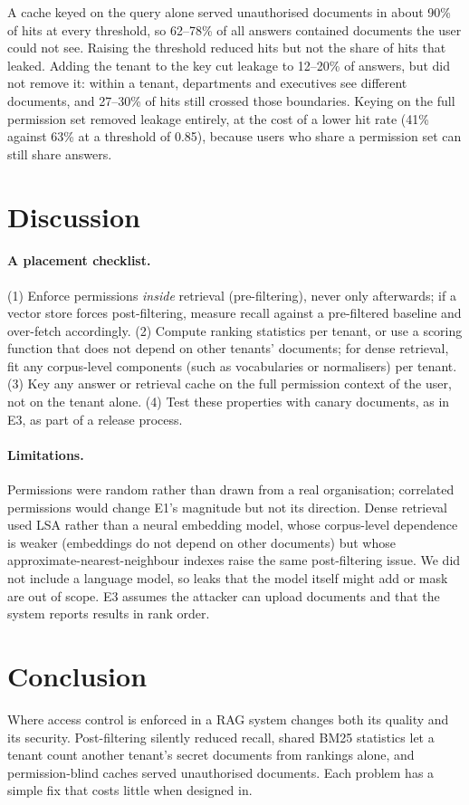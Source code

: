 \documentclass[11pt]{article}
\begin{document}
A cache keyed on the query alone served unauthorised documents in about 90\% of hits at every threshold, so 62--78\% of all answers
contained documents the user could not see. Raising the threshold reduced hits but not the share of hits that leaked. Adding the tenant
to the key cut leakage to 12--20\% of answers, but did not remove it: within a tenant, departments and executives see different
documents, and 27--30\% of hits still crossed those boundaries. Keying on the full permission set removed leakage entirely, at the
cost of a lower hit rate (41\% against 63\% at a threshold of 0.85), because users who share a permission set can still share answers.

\section{Discussion}
\paragraph{A placement checklist.}
(1) Enforce permissions \emph{inside} retrieval (pre-filtering), never only afterwards; if a vector store forces post-filtering, measure
recall against a pre-filtered baseline and over-fetch accordingly. (2) Compute ranking statistics per tenant, or use a scoring function
that does not depend on other tenants' documents; for dense retrieval, fit any corpus-level components (such as vocabularies or
normalisers) per tenant. (3) Key any answer or retrieval cache on the full permission context of the user, not on the tenant alone.
(4) Test these properties with canary documents, as in E3, as part of a release process.

\paragraph{Limitations.} Permissions were random rather than drawn from a real organisation; correlated permissions would change E1's
magnitude but not its direction. Dense retrieval used LSA rather than a neural embedding model, whose corpus-level dependence is
weaker (embeddings do not depend on other documents) but whose approximate-nearest-neighbour indexes raise the same post-filtering
issue. We did not include a language model, so leaks that the model itself might add or mask are out of scope. E3 assumes the attacker
can upload documents and that the system reports results in rank order.

\section{Conclusion}
Where access control is enforced in a RAG system changes both its quality and its security. Post-filtering silently reduced recall,
shared BM25 statistics let a tenant count another tenant's secret documents from rankings alone, and permission-blind caches served
unauthorised documents. Each problem has a simple fix that costs little when designed in.
\end{document}
